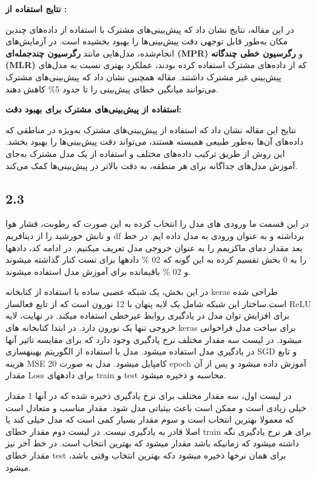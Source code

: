 \documentclass{article}
\begin{document}
\textbf{نتایج استفاده از :}

در این مقاله، نتایج نشان داد که پیش‌بینی‌های مشترک با استفاده از داده‌های چندین مکان به‌طور قابل توجهی دقت پیش‌بینی‌ها را بهبود بخشیده است. در آزمایش‌های انجام‌شده، مدل‌هایی مانند \textbf{رگرسیون چندجمله‌ای (MPR)} و \textbf{رگرسیون خطی چندگانه (MLR)} که از داده‌های مشترک استفاده کرده بودند، عملکرد بهتری نسبت به مدل‌های پیش‌بینی غیر مشترک داشتند. مقاله همچنین نشان داد که پیش‌بینی‌های مشترک می‌توانند میانگین خطای پیش‌بینی را تا حدود 5\% کاهش دهند.

\textbf{استفاده از پیش‌بینی‌های مشترک برای بهبود دقت:}

نتایج این مقاله نشان داد که استفاده از پیش‌بینی‌های مشترک به‌ویژه در مناطقی که داده‌های آن‌ها به‌طور طبیعی همبسته هستند، می‌تواند دقت پیش‌بینی‌ها را بهبود بخشد. این روش از طریق ترکیب داده‌های مختلف و استفاده از یک مدل مشترک به‌جای آموزش مدل‌های جداگانه برای هر منطقه، به دقت بالاتر در پیش‌بینی‌ها کمک می‌کند.

\subsection{2.3}

در این قسمت ما ورودی های مدل را انتخاب کرده به این صورت که رطوبت، فشار هوا و تابش خورشید را از دیتافریم df برداشته و
به عنوان ورودی به مدل داده ایم. در خط بعد مقدار دمای ماکزیمم را به عنوان خروجی مدل تعریف میکنیم. در ادامه کد، دادهها را
به 0 بخش تقسیم کرده به این گونه که 02 \% دادهها برای تست کنار گذاشته میشوند و 02 \% باقیمانده برای آموزش مدل استفاده
میشوند.


در این بخش، یک شبکه عصبی ساده با استفاده از کتابخانه keras طراحی شده است.ساختار این شبکه شامل یک لایه پنهان با 12
نورون است که از تابع فعالساز ReLU برای افزایش توان مدل در یادگیری روابط غیرخطی استفاده میکند. در نهایت، لایه خروجی
تنها یک نورون دارد. در ابتدا کتابخانه های keras برای ساخت مدل فراخوانی میشود. در لیست  سه مقدار مختلف
نرخ یادگیری وجود دارد که برای مقایسه تاثیر آنها در یادگیری مدل استفاده میشود. مدل با استفاده از الگوریتم بهینهسازی SGD و
تابع هزینه MSE کامپایل میشود. مدل به صورت 20 epoch آموزش داده میشود و پس از آن مقدار Loss برای دادههای train و
test محاسبه و ذخیره میشود.


در لیست اول، سه مقدار مختلف برای نرخ یادگیری ذخیره شده که در آنها 1 مقدار خیلی زیادی است و ممکن است باعث بیثباتی
مدل شود.  مقدار مناسب و متعادل است که معمولا بهترین انتخاب است و سوم  مقدار بسیار کمی است که مدل
خیلی کند یا اصلا قادر به یادگیری نیست. در لیست دوم مقدار خطای train برای هر نرخ یادگیری نگه داشته میشود که زمانیکه
 باشد مقدار  میشود که بهترین انتخاب است. در خط آخر نیز مقدار خطای test برای
همان نرخها ذخیره میشود دکه بهترین انتخاب وقتی  باشد،  میشود.
\end{document}
